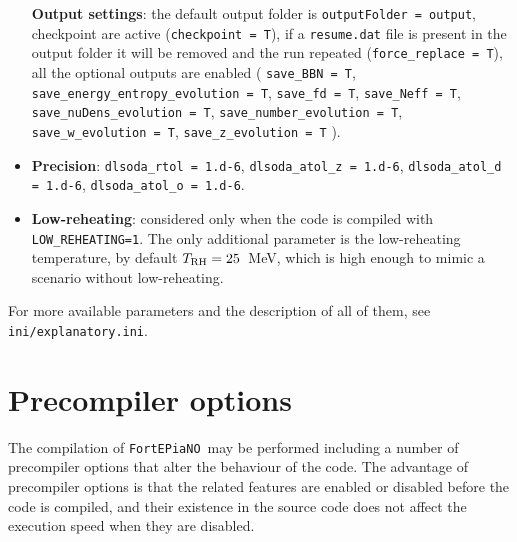 \documentclass[notitlepage,showpacs,preprintnumbers,amsmath,amssymb,superscriptaddress,prd,onecolumn]{revtex4-1}
\newcommand{\fortepiano}{\texttt{FortEPiaNO}}
\begin{document}
\begin{itemize}
\textbf{Output settings}:
the default output folder is \texttt{outputFolder = output},
checkpoint are active (\texttt{checkpoint = T}),
if a \texttt{resume.dat} file is present in the output folder it will be removed and the run repeated
(\texttt{force\_replace = T}),
all the optional outputs are enabled (%
\texttt{save\_BBN = T},
\texttt{save\_energy\_entropy\_evolution = T},
\texttt{save\_fd = T},
\texttt{save\_Neff = T},
\texttt{save\_nuDens\_evolution = T},
\texttt{save\_number\_evolution = T},
\texttt{save\_w\_evolution = T},
\texttt{save\_z\_evolution = T}%
).
%
\item \textbf{Precision}:
\texttt{dlsoda\_rtol = 1.d-6},
\texttt{dlsoda\_atol\_z = 1.d-6},
\texttt{dlsoda\_atol\_d = 1.d-6},
\texttt{dlsoda\_atol\_o = 1.d-6}.
%
\item \textbf{Low-reheating}:
considered only when the code is compiled with \texttt{LOW\_REHEATING=1}.
The only additional parameter is the low-reheating temperature, by default $T_{\rm RH}=25$~MeV,
which is high enough to mimic a scenario without low-reheating.
%
\end{itemize}
For more available parameters and the description of all of them, see \texttt{ini/explanatory.ini}.


\section{Precompiler options}
\label{ssec:precompiler}
The compilation of \fortepiano\ may be performed including a number of precompiler options
that alter the behaviour of the code.
The advantage of precompiler options is that the related features are enabled or disabled
before the code is compiled, and their existence in the source code
does not affect the execution speed when they are disabled.
\end{document}
